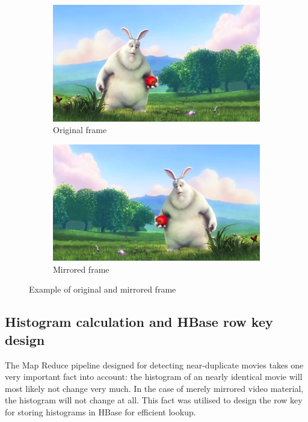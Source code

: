 \begin{figure}[ch!]
        \centering
        \begin{subfigure}[b]{0.45\textwidth}
                \includegraphics[width=\textwidth]{img/Big_Buck_Bunny_normal.png}
                \caption{Original frame}
                \label{fig:original-frame}
        \end{subfigure}
        \begin{subfigure}[b]{0.45\textwidth}
                \includegraphics[width=\textwidth]{img/Big_Buck_Bunny_mirror.png}
                \caption{Mirrored frame}
                \label{fig:mirrored-frame}
        \end{subfigure}
        \caption{Example of original and mirrored frame}
        \label{fig:frames-mirrored}
\end{figure}





\subsection{Histogram calculation and HBase row key design}
The Map Reduce pipeline designed for detecting near-duplicate movies takes one very important fact into account: the histogram of an nearly identical movie will most likely not change very much. In the case of merely mirrored video material, the histogram will not change at all. This fact was utilised to design the row key for storing histograms in HBase for efficient lookup.

